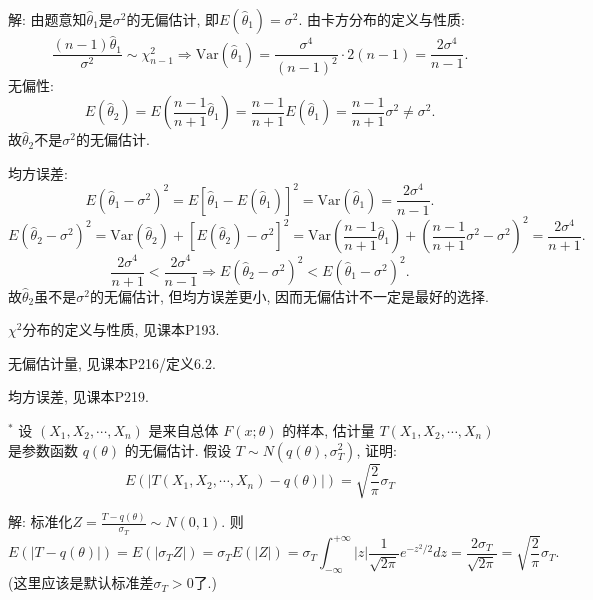 \documentclass[standard]{ExBook}
\renewenvironment{shaded}{%
  \def\FrameCommand{\fboxsep=\FrameSep \colorbox{shadecolor}}%
  \MakeFramed{\advance\hsize-\width \FrameRestore}%
}{%
  \endMakeFramed
}
\begin{document}
\begin{qitems}
\vspace{\dimexpr2.5cm-5em\relax}

解: 由题意知$\hat{\theta}_1$是$\sigma^2$的无偏估计, 即$E(\hat{\theta}_1)=\sigma^2$.
由卡方分布的定义与性质:
$$
\frac{(n-1)\hat{\theta}_1}{\sigma^2}\sim\chi_{n-1}^2
\Longrightarrow
\mathrm{Var}(\hat{\theta}_1)
=\frac{\sigma^4}{(n-1)^2}\cdot 2(n-1)
=\frac{2\sigma^4}{n-1}.
$$
无偏性:
$$
E(\hat{\theta}_2)
=E\left(\frac{n-1}{n+1}\hat{\theta}_1\right)
=\frac{n-1}{n+1}E(\hat{\theta}_1)
=\frac{n-1}{n+1}\sigma^2
\neq \sigma^2.
$$
故$\hat{\theta}_2$不是$\sigma^2$的无偏估计.

均方误差:
$$
E(\hat{\theta}_1-\sigma^2)^2
=E[\hat{\theta}_1-E(\hat{\theta}_1)]^2
=\mathrm{Var}(\hat{\theta}_1)
=\frac{2\sigma^4}{n-1}.
$$
$$
E(\hat{\theta}_2-\sigma^2)^2
=\mathrm{Var}(\hat{\theta}_2)+[E(\hat{\theta}_2)-\sigma^2]^2
=\mathrm{Var}\left(\frac{n-1}{n+1}\hat{\theta}_1\right)
+\left(\frac{n-1}{n+1}\sigma^2-\sigma^2\right)^2
=\frac{2\sigma^4}{n+1}.
$$
$$
\frac{2\sigma^4}{n+1}<\frac{2\sigma^4}{n-1}
\Longrightarrow
E(\hat{\theta}_2-\sigma^2)^2<E(\hat{\theta}_1-\sigma^2)^2.
$$
故$\hat{\theta}_2$虽不是$\sigma^2$的无偏估计, 但均方误差更小, 因而无偏估计不一定是最好的选择.

\textcolor{themeColor}{\selectfont {} $\chi^2$分布的定义与性质, 见课本P193.}

\textcolor{themeColor}{\selectfont {} 无偏估计量, 见课本P216/定义6.2.}

\textcolor{themeColor}{\selectfont {} 均方误差, 见课本P219.}

\vspace{2.5cm-5em}

    \begin{bbox}
    \begin{shaded}
        \qitem$^*$
设 \((X_1, X_2, \cdots, X_n)\) 是来自总体 \(F(x; \theta)\) 的样本, 估计量 \(T(X_1, X_2, \cdots, X_n)\) 是参数函数 \(q(\theta)\) 的无偏估计. 假设 \(T \sim N(q(\theta), \sigma_T^2)\), 证明:
\[E\left(\left|T(X_1, X_2, \cdots, X_n) - q(\theta)\right|\right) = \sqrt{\frac{2}{\pi}} \sigma_T\]
    \end{shaded}
    \end{bbox}

\vspace{\dimexpr2.5cm-5em\relax}

解: 标准化$Z=\frac{T-q(\theta)}{\sigma_T} \sim N(0,1)$. 则
$$
E\left(|T-q(\theta)|\right)
=E(|\sigma_T Z|)
=\sigma_T E(|Z|)
=\sigma_T\int_{-\infty}^{+\infty}|z|\frac{1}{\sqrt{2\pi}}e^{-z^2/2}dz
=\frac{2\sigma_T}{\sqrt{2\pi}}
=\sqrt{\frac{2}{\pi}}\sigma_T.
$$
(这里应该是默认标准差$\sigma_T>0$了.)


\end{qitems}
\end{document}
